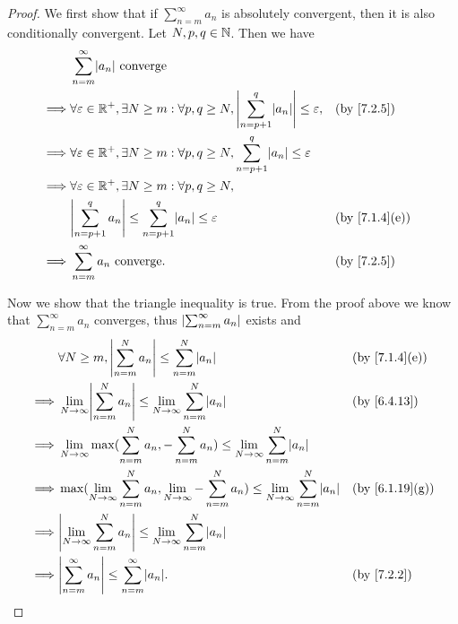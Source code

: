 \begin{proof}
  We first show that if \(\sum_{n = m}^\infty a_n\) is absolutely convergent, then it is also conditionally convergent.
  Let \(N, p, q \in \mathbb{N}\).
  Then we have
  \begin{align*}
             & \sum_{n = m}^\infty \abs{a_n} \text{ converge}                                                                                                              \\
    \implies & \forall \varepsilon \in \R^+, \exists N \geq m : \forall p, q \geq N, \abs{\sum_{n = p + 1}^q \abs{a_n}} \leq \varepsilon, &  & \by{7.2.5}                  \\
    \implies & \forall \varepsilon \in \R^+, \exists N \geq m : \forall p, q \geq N, \sum_{n = p + 1}^q \abs{a_n} \leq \varepsilon                                         \\
    \implies & \forall \varepsilon \in \R^+, \exists N \geq m : \forall p, q \geq N,                                                                                       \\
             & \abs{\sum_{n = p + 1}^q a_n} \leq \sum_{n = p + 1}^q \abs{a_n} \leq \varepsilon                                            &  & \text{(by \cref{7.1.4}(e))} \\
    \implies & \sum_{n = m}^\infty a_n \text{ converge}.                                                                                  &  & \by{7.2.5}
  \end{align*}

  Now we show that the triangle inequality is true.
  From the proof above we know that \(\sum_{n = m}^\infty a_n\) converges, thus \(\left\lvert\sum_{n = m}^\infty a_n\right\rvert\) exists and
  \begin{align*}
             & \forall N \geq m, \abs{\sum_{n = m}^N a_n} \leq \sum_{n = m}^N \abs{a_n}                                                                &  & \text{(by \cref{7.1.4}(e))}  \\
    \implies & \lim_{N \to \infty} \abs{\sum_{n = m}^N a_n} \leq \lim_{N \to \infty} \sum_{n = m}^N \abs{a_n}                                          &  & \by{6.4.13}                  \\
    \implies & \lim_{N \to \infty} \max(\sum_{n = m}^N a_n, -\sum_{n = m}^N a_n) \leq \lim_{N \to \infty} \sum_{n = m}^N \abs{a_n}                                                       \\
    \implies & \max(\lim_{N \to \infty} \sum_{n = m}^N a_n, \lim_{N \to \infty} -\sum_{n = m}^N a_n) \leq \lim_{N \to \infty} \sum_{n = m}^N \abs{a_n} &  & \text{(by \cref{6.1.19}(g))} \\
    \implies & \abs{\lim_{N \to \infty} \sum_{n = m}^N a_n} \leq \lim_{N \to \infty} \sum_{n = m}^N \abs{a_n}                                                                            \\
    \implies & \abs{\sum_{n = m}^\infty a_n} \leq \sum_{n = m}^\infty \abs{a_n}.                                                                       &  & \by{7.2.2}
  \end{align*}
\end{proof}

